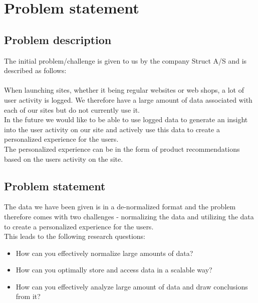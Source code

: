 
\chapter{Problem statement} %

\label{Chapter1} %


\section{Problem description}

The initial problem/challenge  is given to us by the company Struct A/S and is described as follows: \\\\
When launching sites, whether it being regular websites or web shops, a lot of user activity is logged. We therefore have a large amount of data associated with each of our sites but do not currently use it. \\
In the future we would like to be able to use logged data to generate an insight into the user activity on our site and actively use this data to create a personalized experience for the users. \\
The personalized experience can be in the form of product recommendations based on the users activity on the site.



\section{Problem statement}
The data we have been given is in a de-normalized format and the problem therefore comes with two challenges - normalizing the data and utilizing the data to create a personalized experience for the users. \\
This leads to the following research questions:
\begin{itemize}
\item How can you effectively normalize large amounts of data?
\item How can you optimally store and access data in a scalable way?
\item How can you effectively analyze large amount of data and draw conclusions from it?
\end{itemize}
